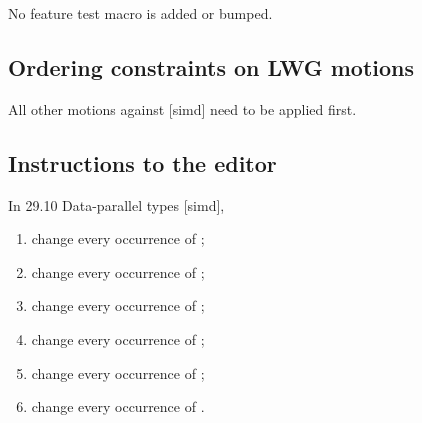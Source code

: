 No feature test macro is added or bumped.

\subsection{Ordering constraints on LWG motions}

All other motions against [simd] need to be applied first.

\subsection{Instructions to the editor}

In 29.10 Data-parallel types [simd],

\begin{enumerate}
  \item change every occurrence of ;
  \item change every occurrence of ;
  \item change every occurrence of ;
  \item change every occurrence of ;
  \item change every occurrence of ;
  \item change every occurrence of .
\end{enumerate}



